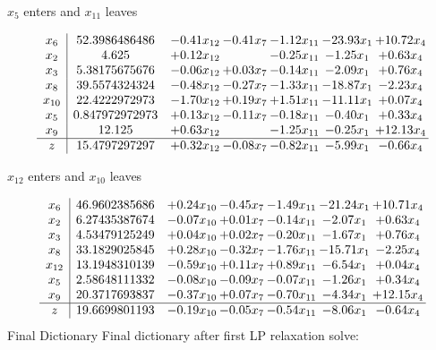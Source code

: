 \documentclass[8pt]{article}
\begin{document}
 $ x_{5} $ enters and $ x_{11} $ leaves 

 \[\begin{array}{c| c c@{\hskip 2pt} c@{\hskip 2pt} c@{\hskip 2pt} c@{\hskip 2pt} c@{\hskip 2pt} }
 x_{6}   &  52.3986486486 & -0.41 x_{12} & -0.41 x_{7} & -1.12 x_{11} & -23.93 x_{1} & + 10.72 x_{4}\\
 x_{2}   &  4.625 & +  0.12 x_{12} &   & -0.25 x_{11} & -1.25 x_{1} & +  0.63 x_{4}\\
 x_{3}   &  5.38175675676 & -0.06 x_{12} & +  0.03 x_{7} & -0.14 x_{11} & -2.09 x_{1} & +  0.76 x_{4}\\
 x_{8}   &  39.5574324324 & -0.48 x_{12} & -0.27 x_{7} & -1.33 x_{11} & -18.87 x_{1} & -2.23 x_{4}\\
 x_{10}   &  22.4222972973 & -1.70 x_{12} & +  0.19 x_{7} & +  1.51 x_{11} & -11.11 x_{1} & +  0.07 x_{4}\\
 x_{5}   &  0.847972972973 & +  0.13 x_{12} & -0.11 x_{7} & -0.18 x_{11} & -0.40 x_{1} & +  0.33 x_{4}\\
 x_{9}   &  12.125 & +  0.63 x_{12} &   & -1.25 x_{11} & -0.25 x_{1} & + 12.13 x_{4}\\
\hline
z    &  15.4797297297 & +  0.32 x_{12} & -0.08 x_{7} & -0.82 x_{11} & -5.99 x_{1} & -0.66 x_{4}\\
\end{array}\]


 $ x_{12} $ enters and $ x_{10} $ leaves 

 \[\begin{array}{c| c c@{\hskip 2pt} c@{\hskip 2pt} c@{\hskip 2pt} c@{\hskip 2pt} c@{\hskip 2pt} }
 x_{6}   &  46.9602385686 & +  0.24 x_{10} & -0.45 x_{7} & -1.49 x_{11} & -21.24 x_{1} & + 10.71 x_{4}\\
 x_{2}   &  6.27435387674 & -0.07 x_{10} & +  0.01 x_{7} & -0.14 x_{11} & -2.07 x_{1} & +  0.63 x_{4}\\
 x_{3}   &  4.53479125249 & +  0.04 x_{10} & +  0.02 x_{7} & -0.20 x_{11} & -1.67 x_{1} & +  0.76 x_{4}\\
 x_{8}   &  33.1829025845 & +  0.28 x_{10} & -0.32 x_{7} & -1.76 x_{11} & -15.71 x_{1} & -2.25 x_{4}\\
 x_{12}   &  13.1948310139 & -0.59 x_{10} & +  0.11 x_{7} & +  0.89 x_{11} & -6.54 x_{1} & +  0.04 x_{4}\\
 x_{5}   &  2.58648111332 & -0.08 x_{10} & -0.09 x_{7} & -0.07 x_{11} & -1.26 x_{1} & +  0.34 x_{4}\\
 x_{9}   &  20.3717693837 & -0.37 x_{10} & +  0.07 x_{7} & -0.70 x_{11} & -4.34 x_{1} & + 12.15 x_{4}\\
\hline
z    &  19.6699801193 & -0.19 x_{10} & -0.05 x_{7} & -0.54 x_{11} & -8.06 x_{1} & -0.64 x_{4}\\
\end{array}\]
Final Dictionary
Final dictionary after first LP relaxation solve: 
\end{document}
